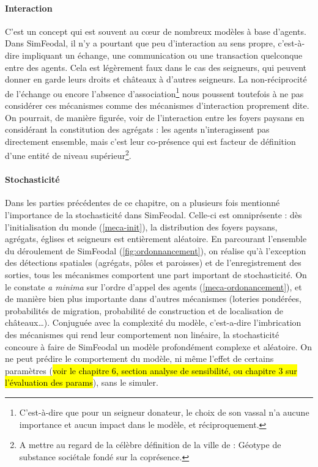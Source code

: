 \paragraph{Interaction} C'est un concept qui est souvent au cœur de nombreux modèles à base d'agents.
Dans SimFeodal, il n'y a pourtant que peu d'interaction au sens propre, c'est-à-dire impliquant un échange, une communication ou une transaction quelconque entre des agents.
Cela est légèrement faux dans le cas des seigneurs, qui peuvent donner en garde leurs droits et châteaux à d'autres seigneurs.
La non-réciprocité de l'échange ou encore l'absence d'\fg{}association\fg{}\footnote{
	C'est-à-dire que pour un seigneur donateur, le choix de son vassal n'a aucune importance et aucun impact dans le modèle, et réciproquement.
} nous poussent toutefois à ne pas considérer ces mécanismes comme des mécanismes d'interaction proprement dite.
On pourrait, de manière figurée, voir de l'interaction entre les foyers paysans en considérant la constitution des agrégats : les agents n'interagissent pas directement ensemble, mais c'est leur co-présence qui est facteur de définition d'une entité de niveau supérieur\footnote{
A mettre au regard de la célèbre définition de la ville de \textcite{levy_ville_2003} : \og Géotype de substance sociétale fondé sur la coprésence\fg{}.
}.
\setcounter{savefootnote}{\value{footnote}}

\paragraph{Stochasticité} Dans les parties précédentes de ce chapitre, on a plusieurs fois mentionné l'importance de la stochasticité dans SimFeodal.
Celle-ci est omniprésente : dès l'initialisation du monde (\cref{meca-init}), la distribution des foyers paysans, agrégats, églises et seigneurs est entièrement aléatoire.
En parcourant l'ensemble du déroulement de SimFeodal (\cref{fig:ordonnancement}), on réalise qu'à l'exception des détections spatiales (agrégats, pôles et paroisses) et de l'enregistrement des sorties, tous les mécanismes comportent une part important de stochasticité.
On le constate \textit{a minima} sur l'ordre d'appel des agents (\cref{meca-ordonancement}), et de manière bien plus importante dans d'autres mécanismes (loteries pondérées, probabilités de migration, probabilité de construction et de localisation de châteaux\ldots).
Conjuguée avec la complexité du modèle, c'est-a-dire l'imbrication des mécanismes qui rend leur comportement non linéaire, la stochasticité concoure à faire de SimFeodal un modèle profondément complexe et aléatoire.
On ne peut prédire le comportement du modèle, ni même l'effet de certains paramètres (\hl{voir le chapitre 6, section analyse de sensibilité, ou chapitre 3 sur l'évaluation des params}), sans le simuler.


